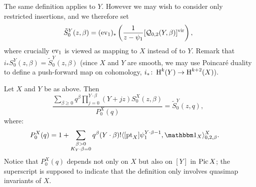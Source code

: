 The same definition applies to $Y$. However we may wish to consider only restricted insertions, and we therefore set
\begin{equation*} \tilde{S}^Y_0(z,\beta) = (\operatorname{ev}_1)_* \left( \dfrac{1}{z-\psi_1} [\mathcal{Q}_{0,2}(Y,\beta)]^{\mathrm{vir}} \right), \end{equation*}
where crucially $\operatorname{ev}_1$ is viewed as mapping to $X$ instead of to $Y$. Remark that $i_* S^Y_0(z,\beta) = \tilde{S}^Y_0(z,\beta)$ (since $X$ and $Y$ are smooth, we may use Poincar\'{e} duality to define a push-forward map on cohomology, $i_* \colon \operatorname{H}^k(Y) \rightarrow \operatorname{H}^{k+2}(X)$).

\begin{thm} \label{Theorem Quantum Lefschetz}
Let $X$ and $Y$ be as above. Then
\begin{equation}\label{eqn:mirror}
\dfrac{\sum_{\beta\geq 0} q^\beta\prod_{j=0}^{Y\cdot\beta}(Y+jz)S_0^X(z,\beta)}{P_0^X(q)}= \tilde{S}_0^Y(z,q),
\end{equation}
where:
\begin{align*}
 P_0^X(q) %
            & = 1 + \sum_{\substack{\beta>0 \\ K_Y\cdot\beta=0}} q^\beta(Y\cdot\beta)!\langle [\pt_X] \psi_1^{Y\cdot\beta-1} ,\mathbbm 1_{X}\rangle_{0,2,\beta}^X.
\end{align*}
Notice that $P_0^X(q)$ depends not only on $X$ but also on $[Y]$ in $\operatorname{Pic} X$; the superscript is supposed to indicate that the definition only involves quasimap invariants of $X$.
\end{thm}

